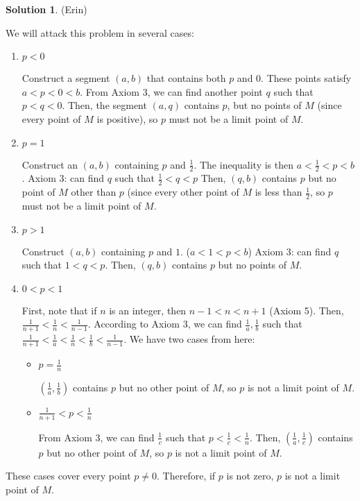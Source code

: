 \documentclass{article}
\theoremstyle{definition}
\newtheorem{solution}{Solution}
\begin{document}
\begin{solution} %
(Erin)

We will attack this problem in several cases:

\begin{enumerate}
\item $p < 0$

Construct a segment $(a, b)$ that contains both $p$ and 0. 
These points satisfy $a < p < 0 < b$.
From Axiom 3, we can find another point $q$ such that $p < q < 0$.
Then, the segment $(a, q)$ contains $p$, but no points of $M$ (since every point of $M$ is positive), so $p$ must not be a limit point of $M$.

\item $p = 1$

Construct an $(a, b)$ containing $p$ and $\frac{1}{2}$.
The inequality is then $a < \frac{1}{2} < p < b$. 
Axiom 3: can find $q$ such that $\frac{1}{2} < q < p$
Then, $(q, b)$ contains $p$ but no point of $M$ other than $p$ (since every other point of $M$ is less than $\frac{1}{2}$, so $p$ must not be a limit point of $M$.

\item $p > 1$

Construct $(a, b)$ containing $p$ and $1$.
($a < 1 < p < b$)
Axiom 3: can find $q$ such that $1 < q < p$.
Then, $(q, b)$ contains $p$ but no points of $M$.

\item $0 < p < 1$

First, note that if $n$ is an integer, then $n-1 < n < n+1$ (Axiom 5).
Then, $\frac{1}{n+1} < \frac{1}{n} < \frac{1}{n-1}$.
According to Axiom 3, we can find $\frac{1}{a}, \frac{1}{b}$ such that $\frac{1}{n+1} < \frac{1}{a} < \frac{1}{n} < \frac{1}{b} < \frac{1}{n-1}$.
We have two cases from here:

\begin{itemize}
\item $p = \frac{1}{n}$

$(\frac{1}{a}, \frac{1}{b})$ contains $p$ but no other point of $M$, so $p$ is not a limit point of $M$.

\item $\frac{1}{n+1} < p < \frac{1}{n}$

From Axiom 3, we can find $\frac{1}{c}$ such that $p < \frac{1}{c} < \frac{1}{n}$.
Then, $(\frac{1}{a}, \frac{1}{c})$ contains $p$ but no other point of $M$, so $p$ is not a limit point of $M$.
\end{itemize}
\end{enumerate}

These cases cover every point $p \neq 0$. Therefore, if $p$ is not zero, $p$ is not a limit point of $M$.
\end{solution}
\end{document}
